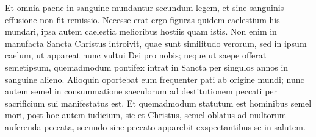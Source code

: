 \begin{biblechapter}
\verse Et omnia paene in sanguine mundantur secundum legem, et sine sanguinis effusione non fit remissio. 
\verse Necesse erat ergo figuras quidem caelestium his mundari, ipsa autem caelestia melioribus hostiis quam istis. 
\verse Non enim in manufacta Sancta Christus introivit, quae sunt similitudo verorum, sed in ipsum caelum, ut appareat nunc vultui Dei pro nobis; 
\verse neque ut saepe offerat semetipsum, quemadmodum pontifex intrat in Sancta per singulos annos in sanguine alieno. 
\verse Alioquin oportebat eum frequenter pati ab origine mundi; nunc autem semel in consummatione saeculorum ad destitutionem peccati per sacrificium sui manifestatus est. 
\verse Et quemadmodum statutum est hominibus semel mori, post hoc autem iudicium, 
\verse sic et Christus, semel oblatus ad multorum auferenda peccata, secundo sine peccato apparebit exspectantibus se in salutem. 
\end{biblechapter}

